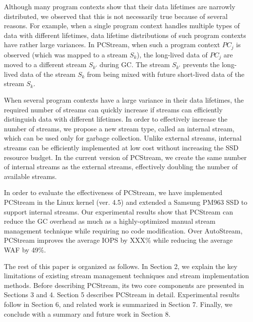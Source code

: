 Although many program contexts show that their data lifetimes are 
narrowly distributed, we observed that 
{\color{blue}
this is not necessarily true because of several reasons.  
For example, when a single program context handles multiple types of data with 
different lifetimes, data lifetime distributions of such
program contexts  
}
have rather large variances.
In \textsf{\small PCStream}, 
when such a program context {\it $PC_j$} is observed 
(which was mapped to a stream {\it $S_k$}), 
the long-lived data of {\it $PC_j$} are moved to a different stream {\it $S_{k'}$}
during GC.  
The stream {\it $S_{k'}$} prevents the long-lived data of the stream {\it $S_k$} 
from being mixed with future short-lived data of the stream {\it $S_k$}.

When several program contexts have a large variance in their data lifetimes, 
the required number of streams can quickly increase if streams can efficiently 
distinguish data with different lifetimes.
In order to effectively increase the number of streams, we propose a new stream type, 
called an internal stream, which can be used only for garbage collection.
Unlike external streams, internal streams can be efficiently
implemented at low cost without increasing the SSD resource budget.  
In the current version of \textsf{\small PCStream}, we create the same number of internal streams 
as the external streams, effectively doubling the number of available streams. 

In order to evaluate the effectiveness of \textsf{\small PCStream}, 
we have implemented \textsf{\small PCStream}
in the Linux kernel (ver. 4.5) and 
extended a Samsung PM963 SSD to support internal streams.
Our experimental results show that \textsf{\small PCStream}
can reduce the GC overhead as much as a highly-optimized 
manual stream management technique while requiring no code modification.  
Over \textsf{\small AutoStream}, \textsf{\small PCStream} improves the average IOPS
by XXX\% while reducing the average WAF by 49\%.

The rest of this paper is organized as follows. 
In Section 2, we explain the key limitations of 
existing stream management techniques and stream implementation methods.
Before describing \textsf{\small PCStream}, its two core components are 
presented in Sections 3 and 4.
Section 5 describes \textsf{\small PCStream} in detail.
Experimental results follow in Section 6,
and related work is summarized in Section 7.  
Finally, we conclude with a summary and future work in Section 8.

